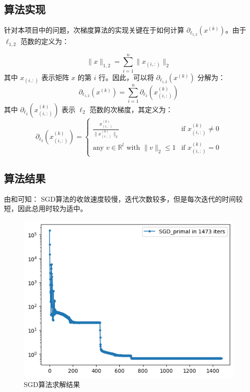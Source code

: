 \documentclass[journal, a4paper]{IEEEtran}
\begin{document}
\subsection{\textbf{算法实现}}

针对本项目中的问题，次梯度算法的实现关键在于如何计算 $\partial_{\ell_{1,2}}(x^{(k)})$。由于 $\ell_{1,2}$ 范数的定义为：

\begin{equation*}\label{eq:l12}
    \lVert x \rVert_{1,2} = \sum_{i=1}^{n} \lVert x_{(i, :)} \rVert_2
\end{equation*}
其中 $x_{(i, :)}$ 表示矩阵 $x$ 的第 $i$ 行。因此，可以将 $\partial_{\ell_{1,2}}(x^{(k)})$ 分解为：
\begin{equation*}\label{eq:subgrad}
    \partial_{\ell_{1,2}}(x^{(k)}) = \sum_{i=1}^{n} \partial_{\ell_2}(x_{(i, :)}^{(k)})
\end{equation*}
其中 $\partial_{\ell_2}(x_{(i, :)}^{(k)})$ 表示 $\ell_2$ 范数的次梯度，其定义为：
\begin{equation*}\label{eq:l2subgrad}
    \partial_{\ell_2}(x_{(i, :)}^{(k)}) = \begin{cases}
        \frac{x_{(i, :)}^{(k)}}{\lVert x_{(i, :)}^{(k)} \rVert_2} & \text{if } x_{(i, :)}^{(k)} \neq 0 \\
        \text{any } v \in \mathbb{R}^l \text{ with } \lVert v \rVert_2 \leq 1 & \text{if } x_{(i, :)}^{(k)} = 0
    \end{cases}
\end{equation*}


\subsection{\textbf{算法结果}}

由和可知：
SGD算法的收敛速度较慢，迭代次数较多，但是每次迭代的时间较短，因此总用时较为适中。

\begin{figure}[htbp]
    \centering
    \includegraphics[width=0.8\columnwidth]{img/SGD.png}
    {\centering \small \caption{SGD算法求解结果\label{fig:SGD}}}
\end{figure}
\end{document}
